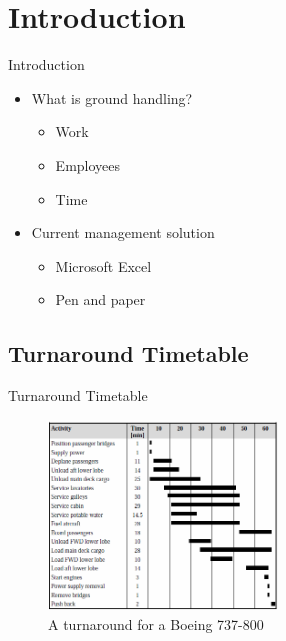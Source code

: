 \section{Introduction}
\begin{frame}{Introduction}{}
	\begin{itemize}
		\item What is ground handling?
		\begin{itemize}
			\item Work
			\item Employees
			\item Time
		\end{itemize}
		\item Current management solution
		\begin{itemize}
			\item Microsoft Excel
			\item Pen and paper
		\end{itemize}
	\end{itemize}
\end{frame}

\subsection{Turnaround Timetable}
\begin{frame}{Turnaround Timetable}{}
	\begin{figure}[H]
		\centering
		\includegraphics[width=230px]{Grafik/timetable}
		\caption{\footnotesize A turnaround for a Boeing 737-800}
\end{figure}
\end{frame}
